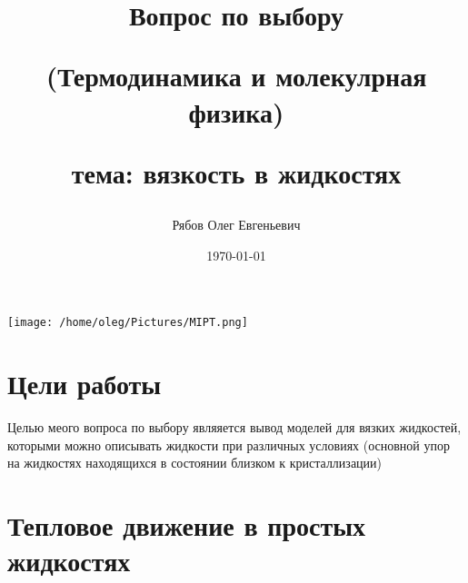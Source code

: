 \documentclass[a4paper, 12pt]{article}
\begin{document}
 

\pagestyle{main}



\begin{titlepage}
    \title{Вопрос по выбору 
    
    (Термодинамика и молекулрная физика)

    тема: вязкость в жидкостях
    }
    \author{Рябов Олег Евгеньевич}
    \date{\today}
    \maketitle
    \vfill
    \begin{center}
        \texttt{[image: /home/oleg/Pictures/MIPT.png]}
    \end{center}
\end{titlepage}
 




\tableofcontents
\newpage
\section{Цели работы}
Целью меого вопроса по выбору являяется вывод моделей для вязких жидкостей, которыми можно описывать жидкости
при различных условиях (основной упор на жидкостях находящихся в состоянии близком к кристаллизации)

\section{Тепловое движение в простых жидкостях}
\end{document}
